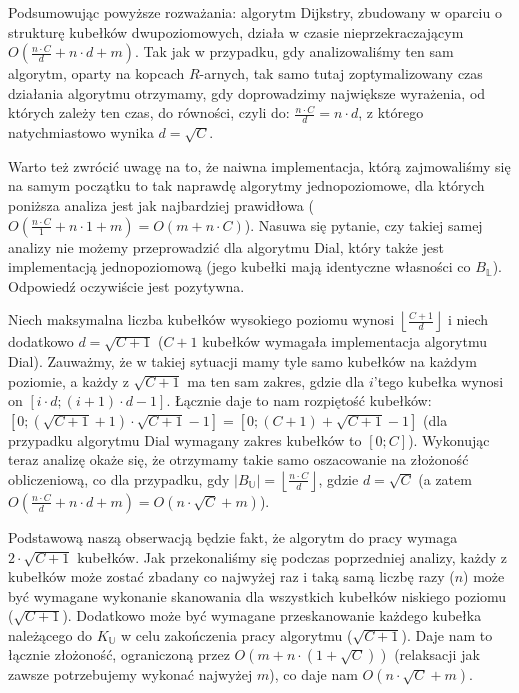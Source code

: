 Podsumowując powyższe rozważania: algorytm Dijkstry, zbudowany w oparciu o strukturę kubełków dwupoziomowych, działa w czasie nieprzekraczającym $ O \left( \frac{n \cdot C}{d} + n \cdot d + m \right)$. Tak jak w przypadku, gdy analizowaliśmy ten sam algorytm, oparty na kopcach $R$-arnych, tak samo tutaj zoptymalizowany czas działania algorytmu otrzymamy, gdy doprowadzimy największe wyrażenia, od których zależy ten czas, do równości, czyli do: $\frac{n \cdot C}{d} = n \cdot d$, z którego natychmiastowo wynika $d = \sqrt{C}$.

Warto też zwrócić uwagę na to, że naiwna implementacja, którą zajmowaliśmy się na samym początku to tak naprawdę algorytmy jednopoziomowe, dla których poniższa analiza jest jak najbardziej prawidłowa ($ O \left( \frac{n \cdot C}{1} + n \cdot 1 + m \right) = O \left( m + n \cdot C \right)$). Nasuwa się pytanie, czy takiej samej analizy nie możemy przeprowadzić dla algorytmu Dial, który także jest implementacją jednopoziomową (jego kubełki mają identyczne własności co $B_{\mathbb{L}}$). Odpowiedź oczywiście jest pozytywna.

Niech maksymalna liczba kubełków wysokiego poziomu wynosi $\left \lfloor \frac{C+1}{d} \right \rfloor$ i niech dodatkowo $d = \sqrt{C + 1}$ ($C+1$ kubełków wymagała implementacja algorytmu Dial). Zauważmy, że w takiej sytuacji mamy tyle samo kubełków na każdym poziomie, a każdy z $ \sqrt{C + 1}$ ma ten sam zakres, gdzie dla $i$'tego kubełka wynosi on $ \left[ i \cdot d ; \left( i+1 \right) \cdot d - 1\right]$. Łącznie daje to nam rozpiętość kubełków: $ \left[ 0 ; \left( \sqrt{C + 1} +1 \right) \cdot \sqrt {C + 1} - 1\right] = \left[ 0 ; \left( C + 1 \right) + \sqrt{C + 1} - 1 \right] $ (dla przypadku algorytmu Dial wymagany zakres kubełków to $ \left[ 0 ; C \right]$). Wykonując teraz analizę okaże się, że otrzymamy takie samo oszacowanie na złożoność obliczeniową, co dla przypadku, gdy $ \left| B_{\mathbb{U}} \right| = \left \lfloor \frac{n \cdot C}{d} \right \rfloor $, gdzie $d = \sqrt{C}$ (a zatem $ O \left( \frac{n \cdot C}{d} + n \cdot d + m \right) =  O \left( n \cdot \sqrt{C} + m \right)$).

Podstawową naszą obserwacją będzie fakt, że algorytm do pracy wymaga $ 2 \cdot \sqrt{C+1}$ kubełków. Jak przekonaliśmy się podczas poprzedniej analizy, każdy z kubełków może zostać zbadany co najwyżej raz i taką samą liczbę razy ($n$) może być wymagane wykonanie skanowania dla wszystkich kubełków niskiego poziomu ($ \sqrt{C+1}$). Dodatkowo może być wymagane przeskanowanie każdego kubełka należącego do $K_{\mathbb{U}}$ w celu zakończenia pracy algorytmu ($ \sqrt{C+1}$). Daje nam to łącznie złożoność, ograniczoną przez $ O \left( m + n \cdot \left( 1 + \sqrt{C} \right) \right)$ (relaksacji jak zawsze potrzebujemy wykonać najwyżej $m$), co daje nam $O \left( n \cdot \sqrt{C} + m \right)$.

